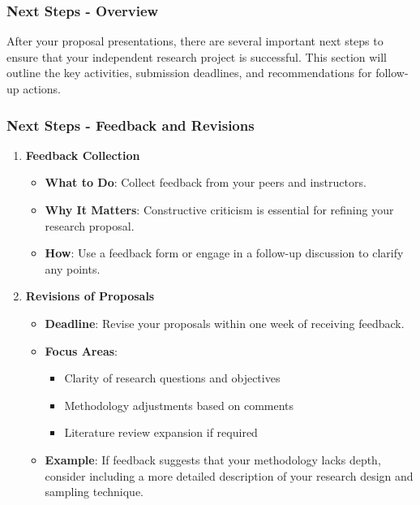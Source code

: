 \documentclass[aspectratio=169]{beamer}
\begin{document}
\begin{frame}[fragile]
    \frametitle{Next Steps - Overview}
    After your proposal presentations, there are several important next steps to ensure that your independent research project is successful. This section will outline the key activities, submission deadlines, and recommendations for follow-up actions.
\end{frame}

\begin{frame}[fragile]
    \frametitle{Next Steps - Feedback and Revisions}
    \begin{enumerate}
        \item \textbf{Feedback Collection}
        \begin{itemize}
            \item \textbf{What to Do}: Collect feedback from your peers and instructors.
            \item \textbf{Why It Matters}: Constructive criticism is essential for refining your research proposal.
            \item \textbf{How}: Use a feedback form or engage in a follow-up discussion to clarify any points.
        \end{itemize}
        
        \item \textbf{Revisions of Proposals}
        \begin{itemize}
            \item \textbf{Deadline}: Revise your proposals within one week of receiving feedback.
            \item \textbf{Focus Areas}:
            \begin{itemize}
                \item Clarity of research questions and objectives
                \item Methodology adjustments based on comments
                \item Literature review expansion if required
            \end{itemize}
            \item \textbf{Example}: If feedback suggests that your methodology lacks depth, consider including a more detailed description of your research design and sampling technique.
        \end{itemize}
    \end{enumerate}
\end{frame}
\end{document}
